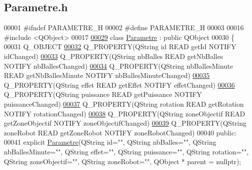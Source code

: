 \hypertarget{_parametre_8h_source}{}\subsection{Parametre.\+h}
\label{_parametre_8h_source}

\begin{DoxyCode}
00001 \textcolor{preprocessor}{#ifndef PARAMETRE\_H}
00002 \textcolor{preprocessor}{#define PARAMETRE\_H}
00003 
00016 \textcolor{preprocessor}{#include <QObject>}
00017 
\hyperlink{class_parametre}{00029} \textcolor{keyword}{class }\hyperlink{class_parametre}{Parametre} : \textcolor{keyword}{public} QObject
00030 \{
00031     Q\_OBJECT
\hyperlink{class_parametre_aa60cee81cf82cba4c7b216f15adf8a80}{00032}     Q\_PROPERTY(QString \textcolor{keywordtype}{id} READ getId NOTIFY idChanged)
\hyperlink{class_parametre_a0423730a9146df04ba4de3f733818e45}{00033}     Q\_PROPERTY(QString nbBalles READ getNbBalles NOTIFY nbBallesChanged)
\hyperlink{class_parametre_a6d2be86cf41aef4e099b0a7421c735c8}{00034}     Q\_PROPERTY(QString nbBallesMinute READ getNbBallesMinute NOTIFY nbBallesMinuteChanged)
\hyperlink{class_parametre_a1ac07f14fbc50b243b57246f662fe67f}{00035}     Q\_PROPERTY(QString effet READ getEffet NOTIFY effetChanged)
\hyperlink{class_parametre_aace4f0265742e479043b3e2afa33771e}{00036}     Q\_PROPERTY(QString puissance READ getPuissance NOTIFY puissanceChanged)
\hyperlink{class_parametre_ab8cd796bb232cba0abe0aab5b02ae52b}{00037}     Q\_PROPERTY(QString rotation READ getRotation NOTIFY rotationChanged)
\hyperlink{class_parametre_a5c1b739e1a70e16ca09e6752743363aa}{00038}     Q\_PROPERTY(QString zoneObjectif READ getZoneObjectif NOTIFY zoneObjectifChanged)
\hyperlink{class_parametre_a85c2e24c35cad5304b5e2edf7289c9c3}{00039}     Q\_PROPERTY(QString zoneRobot READ getZoneRobot NOTIFY zoneRobotChanged)
00040 public:
00041     explicit \hyperlink{class_parametre}{Parametre}(QString \textcolor{keywordtype}{id}="", QString nbBalles="", QString nbBallesMinute="", QString 
      effet="", QString puissance="", QString rotation="", QString zoneObjectif="", QString zoneRobot="", QObject *
      parent = \textcolor{keywordtype}{nullptr});

\end{DoxyCode}

